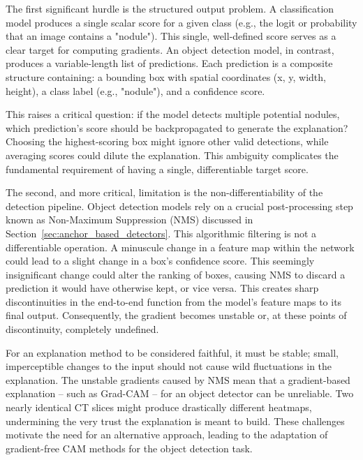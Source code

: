 The first significant hurdle is the structured output problem. A classification model produces a single scalar score for a given class (e.g., the logit or probability that an image contains a "nodule"). This single, well-defined score serves as a clear target for computing gradients. An object detection model, in contrast, produces a variable-length list of predictions. Each prediction is a composite structure containing: a bounding box with spatial coordinates (x, y, width, height), a class label (e.g., "nodule"), and a confidence score.

This raises a critical question: if the model detects multiple potential nodules, which prediction's score should be backpropagated to generate the explanation? Choosing the highest-scoring box might ignore other valid detections, while averaging scores could dilute the explanation. This ambiguity complicates the fundamental requirement of having a single, differentiable target score.

The second, and more critical, limitation is the non-differentiability of the detection pipeline. Object detection models rely on a crucial post-processing step known as Non-Maximum Suppression (NMS) discussed in Section~\ref{sec:anchor_based_detectors}.
This algorithmic filtering is not a differentiable operation. A minuscule change in a feature map within the network could lead to a slight change in a box's confidence score. This seemingly insignificant change could alter the ranking of boxes, causing NMS to discard a prediction it would have otherwise kept, or vice versa. This creates sharp discontinuities in the end-to-end function from the model's feature maps to its final output. Consequently, the gradient becomes unstable or, at these points of discontinuity, completely undefined.

For an explanation method to be considered faithful, it must be stable; small, imperceptible changes to the input should not cause wild fluctuations in the explanation. The unstable gradients caused by NMS mean that a gradient-based explanation -- such as Grad-CAM -- for an object detector can be unreliable. Two nearly identical CT slices might produce drastically different heatmaps, undermining the very trust the explanation is meant to build. These challenges motivate the need for an alternative approach, leading to the adaptation of gradient-free CAM methods for the object detection task.

